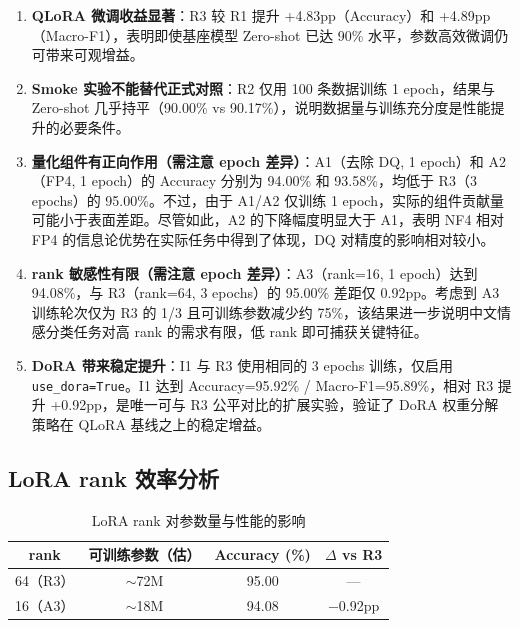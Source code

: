 \documentclass[12pt,a4paper]{article}
\begin{document}
\begin{enumerate}[leftmargin=2em]
  \item \textbf{QLoRA 微调收益显著}：R3 较 R1 提升 +4.83pp（Accuracy）和 +4.89pp（Macro-F1），表明即使基座模型 Zero-shot 已达 90\% 水平，参数高效微调仍可带来可观增益。

  \item \textbf{Smoke 实验不能替代正式对照}：R2 仅用 100 条数据训练 1 epoch，结果与 Zero-shot 几乎持平（90.00\% vs 90.17\%），说明数据量与训练充分度是性能提升的必要条件。

  \item \textbf{量化组件有正向作用（需注意 epoch 差异）}：A1（去除 DQ, 1 epoch）和 A2（FP4, 1 epoch）的 Accuracy 分别为 94.00\% 和 93.58\%，均低于 R3（3 epochs）的 95.00\%。不过，由于 A1/A2 仅训练 1 epoch，实际的组件贡献量可能小于表面差距。尽管如此，A2 的下降幅度明显大于 A1，表明 NF4 相对 FP4 的信息论优势在实际任务中得到了体现，DQ 对精度的影响相对较小。

  \item \textbf{rank 敏感性有限（需注意 epoch 差异）}：A3（rank=16, 1 epoch）达到 94.08\%，与 R3（rank=64, 3 epochs）的 95.00\% 差距仅 0.92pp。考虑到 A3 训练轮次仅为 R3 的 1/3 且可训练参数减少约 75\%，该结果进一步说明中文情感分类任务对高 rank 的需求有限，低 rank 即可捕获关键特征。

  \item \textbf{DoRA 带来稳定提升}：I1 与 R3 使用相同的 3 epochs 训练，仅启用 \texttt{use\_dora=True}。I1 达到 Accuracy=95.92\% / Macro-F1=95.89\%，相对 R3 提升 +0.92pp，是唯一可与 R3 公平对比的扩展实验，验证了 DoRA 权重分解策略在 QLoRA 基线之上的稳定增益。
\end{enumerate}

\subsection{LoRA rank 效率分析}

\begin{table}[H]
\centering
\caption{LoRA rank 对参数量与性能的影响}
\label{tab:rank_analysis}
\begin{tabular}{cccc}
\toprule
\textbf{rank} & \textbf{可训练参数（估）} & \textbf{Accuracy (\%)} & \textbf{$\Delta$ vs R3} \\
\midrule
64（R3） & $\sim$72M & 95.00 & — \\
16（A3） & $\sim$18M & 94.08 & $-$0.92pp \\
\bottomrule
\end{tabular}
\end{table}
\end{document}

